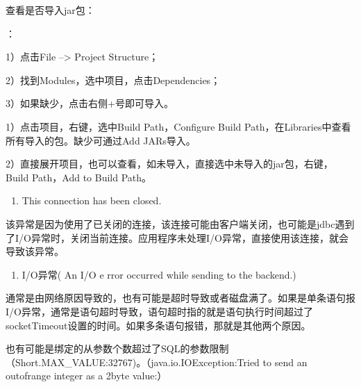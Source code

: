 \documentclass[a4,10pt,oneside,english]{sphinxmanual}
\begin{document}
查看是否导入jar包：

：

1）点击File –> Project Structure；

2）找到Modules，选中项目，点击Dependencies；

3）如果缺少，点击右侧+号即可导入。

\begin{figure}[H]
\centering

\noindent{}
\end{figure}


1）点击项目，右键，选中Build Path，Configure Build Path，在Libraries中查看所有导入的包。缺少可通过Add JARs导入。

\begin{figure}[H]
\centering

\noindent{}
\end{figure}

2）直接展开项目，也可以查看，如未导入，直接选中未导入的jar包，右键，Build Path，Add to Build Path。

\begin{figure}[H]
\centering

\noindent{}
\end{figure}
\begin{enumerate}
%
\setcounter{enumi}{3}
\item {} 
This connection has been closed.

\end{enumerate}

该异常是因为使用了已关闭的连接，该连接可能由客户端关闭，也可能是jdbc遇到了I/O异常时，关闭当前连接。应用程序未处理I/O异常，直接使用该连接，就会导致该异常。
\begin{enumerate}
%
\setcounter{enumi}{4}
\item {} 
I/O异常( An I/O e rror occurred while sending to the backend.)

\end{enumerate}

通常是由网络原因导致的，也有可能是超时导致或者磁盘满了。如果是单条语句报I/O异常，通常是语句超时导致，语句超时指的就是语句执行时间超过了socketTimeout设置的时间。如果多条语句报错，那就是其他两个原因。

也有可能是绑定的从参数个数超过了SQL的参数限制（Short.MAX\_VALUE:32767)。（java.io.IOException:Tried to send an out\sphinxhyphen{}of\sphinxhyphen{}range integer as a 2\sphinxhyphen{}byte value:）
\end{document}
